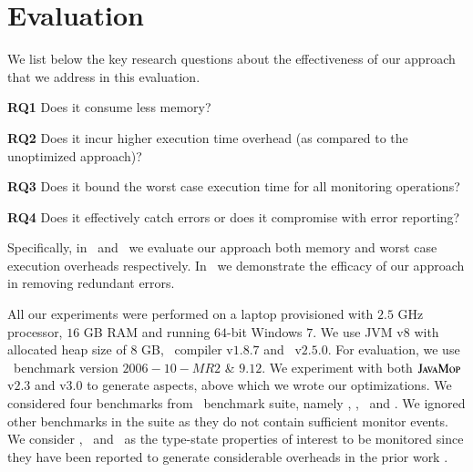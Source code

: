 \section{Evaluation}
\label{sec:evaluation}

We list below the key research questions about the effectiveness of our approach 
that we address in this evaluation.
\begin{mybullet}
\item[\textbf{RQ1}] Does it consume less memory?
\item[\textbf{RQ2}] Does it incur higher execution time overhead (as compared to 
the unoptimized approach)?
\item[\textbf{RQ3}] Does it bound the worst case execution time for all 
monitoring operations?
\item[\textbf{RQ4}] Does it effectively catch errors or does it compromise with 
error reporting?
\end{mybullet}

\noindent Specifically, in~ 
and~ we evaluate our approach both memory and worst 
case execution overheads respectively. In~ we 
demonstrate the efficacy of our approach in removing redundant errors.

 All our experiments were performed on a laptop 
provisioned with $2.5$ GHz processor, $16$ GB RAM and running $64$-bit Windows 
$7$. We use JVM v$8$ with allocated heap size of $8$ GB, \aspectj\ compiler 
v$1.8.7$ and \soot\ v$2.5.0$. For evaluation, we use \dacapo\ benchmark version 
$2006-10-MR2$ \& $9.12$. We experiment with both $\textsc{JavaMop}$ v$2.3$ and 
v$3.0$ to generate aspects, above which we wrote our optimizations. We 
considered four benchmarks from \dacapo\ benchmark suite, namely \bloat, \pmd, 
\chart\ and \avrora. We ignored other benchmarks in the suite as they do not 
contain sufficient monitor events. We consider \hasnext, \unsafeiter\ and 
\hashset\ as the type-state properties of interest to be monitored since they have been
reported to generate considerable overheads in the prior work \cite{chen2009,
Purandare:2013}.

